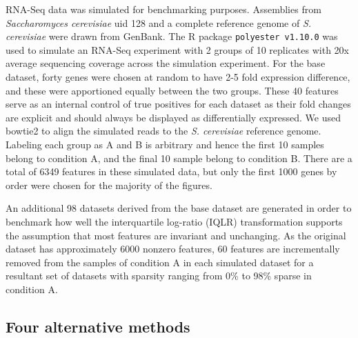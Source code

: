 \documentclass{bmcart}
\begin{document}
RNA-Seq data was simulated for benchmarking purposes. Assemblies from \textit{Saccharomyces cerevisiae} uid 128 and  a complete reference genome of \textit{S. cerevisiae} were drawn from GenBank. The R package \texttt{polyester v1.10.0} \cite{polyester:2016} was used to simulate an RNA-Seq experiment with 2 groups of 10 replicates with 20x average sequencing coverage across the simulation experiment. For the base dataset, forty genes were chosen at random to have 2-5 fold expression difference, and these were apportioned equally between the two groups. These 40 features serve as an internal control of true positives for each dataset as their fold changes are explicit and should always be displayed as differentially expressed. We used bowtie2 \cite{bowtie2} to align the simulated reads  to the \textit{S. cerevisiae} reference genome. Labeling each group as A and B is arbitrary and hence the first 10 samples belong to condition A, and the final 10 sample belong to condition B. There are a total of 6349 features in these simulated data, but only the first 1000 genes by order were chosen for the majority of the figures. 

An additional 98 datasets derived from the base dataset are generated in order to benchmark how well the interquartile log-ratio (IQLR) transformation supports the assumption that most features are invariant and unchanging. As the original dataset has approximately 6000 nonzero features, 60 features are incrementally removed from the samples of condition A in each simulated dataset for a resultant set of datasets with sparsity ranging from 0\% to 98\% sparse in condition A. 


\subsection*{Four alternative methods}
\end{document}
